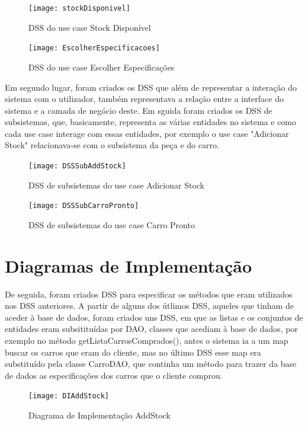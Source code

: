 \documentclass[10pt, a4paper]{report}
\begin{document}
\begin{figure}[!htb]
\centering
\texttt{[image: stockDisponivel]}
\caption{DSS do use case Stock Disponível}
\label{DSS SD}
\end{figure}

\begin{figure}[!htb]
\centering
\texttt{[image: EscolherEspecificacoes]}
\caption{DSS do use case Escolher Especificações}
\label{DSS EE}
\end{figure}

Em segundo lugar, foram criados os DSS que além de representar a interação do sistema com o utilizador, também representava a relação entre a interface do sistema e a camada de negócio deste. Em sguida foram criados os DSS de subsistemas, que, basicamente, representa as várias entidades no sistema e como cada use case interage com essas entidades, por exemplo o use case "Adicionar Stock" relacionava-se com o subsistema da peça e do carro. 

\begin{figure}[!htb]
\centering
\texttt{[image: DSSSubAddStock]}
\caption{DSS de subsistemas do use case Adicionar Stock}
\label{DSSSubAS}
\end{figure}

\begin{figure}[!htb]
\centering
\texttt{[image: DSSSubCarroPronto]}
\caption{DSS de subsistemas do use case Carro Pronto}
\label{DSSSubCP}
\end{figure}


\newpage
\section{Diagramas de Implementação}
De seguida, foram criados DSS para especificar os métodos que eram utilizados nos DSS anteriores. A partir de alguns dos útlimos DSS, aqueles que tinham de aceder à base de dados, foram criados uns DSS, em que as listas e os conjuntos de entidades eram subsitituídas por DAO, classes que acediam à base de dados, por exemplo no método getListaCarrosComprados(), antes o sistema ia a um map buscar os carros que eram do cliente, mas no último DSS esse map era substituído pela classe CarroDAO, que continha um método para trazer da base de dados as especificações dos carros que o cliente comprou.

\begin{figure}[!htb]
\centering
\texttt{[image: DIAddStock]}
\caption{Diagrama de Implementação AddStock}
\label{DIAS}
\end{figure}
\end{document}
